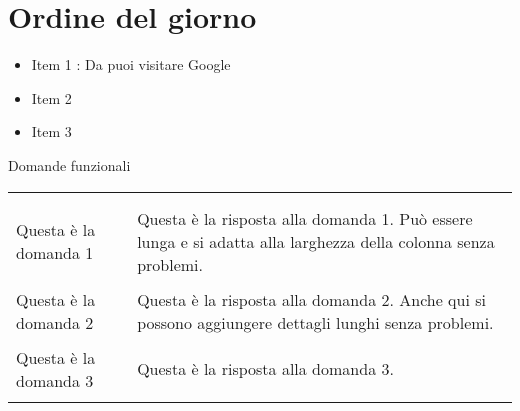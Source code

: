 

\section{Ordine del giorno}

\begin{itemize}
    \item Item 1 : Da  puoi visitare Google
    \item Item 2
    \item Item 3
\end{itemize}

\vspace{2cm}

\begingroup
\renewcommand{\ni}{\noindent}

{\Large Domande funzionali}

\vspace{0.5cm}

\begin{tabular}{>{\justifying\arraybackslash}p{} >{\justifying\arraybackslash}p{}}
    \multicolumn{1}{c}{\textbf{Domande}} & \multicolumn{1}{c}{\textbf{Risposte}} \\ \\
    \ni Questa è la domanda 1 & \ni Questa è la risposta alla domanda 1. Può essere lunga e si adatta alla larghezza della colonna senza problemi. \\ \\
    \ni Questa è la domanda 2 & \ni Questa è la risposta alla domanda 2. Anche qui si possono aggiungere dettagli lunghi senza problemi. \\ \\
    \ni Questa è la domanda 3 & \ni Questa è la risposta alla domanda 3. \\ \\
\end{tabular}

\endgroup